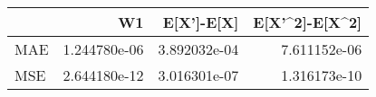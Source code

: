 \begin{tabular}{lrrr}
\toprule
{} &            W1 &    E[X']-E[X] &  E[X'\textasciicircum 2]-E[X\textasciicircum 2] \\
\midrule
MAE &  1.244780e-06 &  3.892032e-04 &    7.611152e-06 \\
MSE &  2.644180e-12 &  3.016301e-07 &    1.316173e-10 \\
\bottomrule
\end{tabular}
